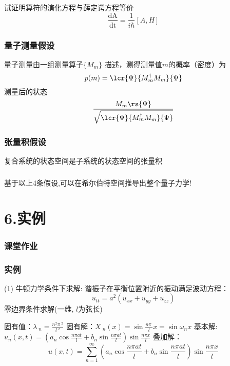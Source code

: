 \begin{frame}
 \frametitle{}
    试证明算符的演化方程与薛定谔方程等价
    \[ \frac{\mathrm{d A}}{\mathrm{d t}} = \frac{1}{i\hbar} [ A, H ] \]
\end{frame}


\begin{frame}
    \frametitle{量子测量假设}
    \begin{tcolorbox4}[3. 量子测量假设]
    量子测量由一组测量算子$\{ M_m\}$ 描述，测得测量值$m$的概率（密度）为
    \[ p(m)=\lcr{\Psi}{M_m ^\dagger M_m}{\Psi} 
     \]
     测量后的状态 \[\frac{M_m\rs{\Psi}}{\sqrt{\lcr{\Psi}{M_m ^\dagger M_m}{\Psi}}}\]
    \end{tcolorbox4}
\end{frame}

\begin{frame}
    \frametitle{张量积假设}
    \begin{tcolorbox4}[4. 复合系统假设]
    复合系统的状态空间是子系统的状态空间的张量积
    \end{tcolorbox4}
\end{frame}

\begin{frame}
    \frametitle{}
    基于以上4条假设,可以在希尔伯特空间推导出整个量子力学! \\ 

\end{frame}

\section{6.实例}

\begin{frame}
    \frametitle{课堂作业}
    \例 [9. 求解自由粒子在位置表象中的波函数]{}    
\end{frame}

\begin{frame}
    \frametitle{实例}
    \例 [10. 求解一维谐振子]{}
    \解 (1) 牛顿力学条件下求解: 谐振子在平衡位置附近的振动满足波动方程：
    \begin{equation*}
        u_{tt}=a^2(u_{xx}+ u_{yy}+u_{zz})
    \end{equation*}
    零边界条件求解(一维, $l$为弦长)
    \begin{enumerate}
        \IItem 固有值：$\displaystyle  \lambda~_n=\frac{n^2\pi~^2}{l~^2}$ 
        \IItem 固有解：{\large $\displaystyle  X~_n(x)=\sin \frac{n\pi~}{l} x=\sin \omega_n x $}
        \IItem 基本解:
        $\displaystyle u_n(x,t) = (a_n\cos\frac{ n\pi at}{l}+ b_n\sin \frac{ n\pi at}{l}) \sin \frac{ n\pi x}{l} $ 
        \IItem 叠加解：
        \[u(x,t) = \sum\limits_{n=1}^{\infty }  (a_n\cos\frac{ n\pi at}{l}+ b_n\sin \frac{ n\pi at}{l}) \sin \frac{ n\pi x}{l}\]
    \end{enumerate}
\end{frame}

